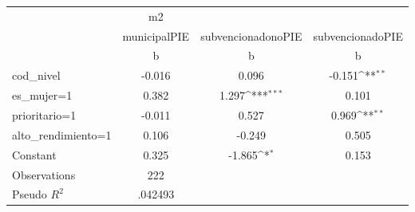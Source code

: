 {
\def\sym#1{\ifmmode^{#1}\else\(^{#1}\)\fi}
\begin{tabular}{l*{3}{c}}
\toprule
                &       m2         &                  &                  \\
                &municipalPIE         &subvencionadonoPIE         &subvencionadoPIE         \\
                &        b         &        b         &        b         \\
\midrule
cod\_nivel       &   -0.016         &    0.096         &   -0.151\sym{**} \\
es\_mujer=1      &    0.382         &    1.297\sym{***}&    0.101         \\
prioritario=1   &   -0.011         &    0.527         &    0.969\sym{**} \\
alto\_rendimiento=1&    0.106         &   -0.249         &    0.505         \\
Constant        &    0.325         &   -1.865\sym{*}  &    0.153         \\
\midrule
Observations    &      222         &                  &                  \\
Pseudo \(R^{2}\)&  .042493         &                  &                  \\
\bottomrule
\end{tabular}
}
